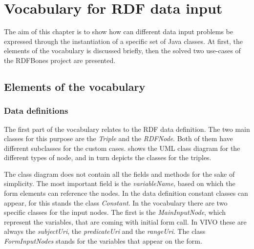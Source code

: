 \chapter{Vocabulary for RDF data input}

The aim of this chapter is to show how can different data input problems be expressed through the instantiation of a specific set of Java classes. At first, the elements of the vocabulary is discussed briefly, then the solved two use-cases of the RDFBones project are presented.

\section{Elements of the vocabulary}

\subsection{Data definitions}

The first part of the vocabulary relates to the RDF data definition. The two main classes for this purpose are the \textit{Triple} and the \textit{RDFNode}. Both of them have different subclasses for the custom cases.  shows the UML class diagram for the different types of node, and  in turn depicts the classes for the triples.


The class diagram does not contain all the fields and methods for the sake of simplicity. The most important field is the \textit{variableName}, based on which the form elements can reference the nodes. In the data definition constant classes can appear, for this stands the class \textit{Constant}. In the vocabulary there are two specific classes for the input nodes. The first is the \textit{MainInputNode}, which represent the variables, that are coming with initial form call. In VIVO these are always the \textit{subjectUri}, the \textit{predicateUri} and the \textit{rangeUri}. The class \textit{FormInputNodes} stands for the variables that appear on the form.


